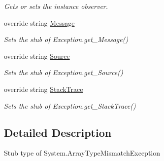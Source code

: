 \begin{DoxyCompactItemize}
\begin{DoxyCompactList}\small\item\em Gets or sets the instance observer.\end{DoxyCompactList}\item 
override string \hyperlink{class_system_1_1_fakes_1_1_stub_array_type_mismatch_exception_a4d1cf77f7a322fe82171def13f16649f}{Message}
\begin{DoxyCompactList}\small\item\em Sets the stub of Exception.\-get\-\_\-\-Message()\end{DoxyCompactList}\item 
override string \hyperlink{class_system_1_1_fakes_1_1_stub_array_type_mismatch_exception_a51c0f6250ede397e44797eb01718280a}{Source}
\begin{DoxyCompactList}\small\item\em Sets the stub of Exception.\-get\-\_\-\-Source()\end{DoxyCompactList}\item 
override string \hyperlink{class_system_1_1_fakes_1_1_stub_array_type_mismatch_exception_a7865da210d3d469a5c7c0049849c0e1f}{Stack\-Trace}
\begin{DoxyCompactList}\small\item\em Sets the stub of Exception.\-get\-\_\-\-Stack\-Trace()\end{DoxyCompactList}\end{DoxyCompactItemize}


\subsection{Detailed Description}
Stub type of System.\-Array\-Type\-Mismatch\-Exception



